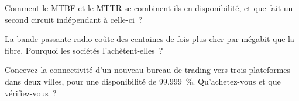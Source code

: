 \begin{interviewq}\label{iq:nw:buying-connectivity:4}
Comment le MTBF et le MTTR se combinent-ils en disponibilité, et que fait un second circuit indépendant à celle-ci~?
\end{interviewq}

\begin{interviewq}\label{iq:nw:buying-connectivity:5}
La bande passante radio coûte des centaines de fois plus cher par mégabit que la fibre. Pourquoi les sociétés l'achètent-elles~?
\end{interviewq}

\begin{interviewq}\label{iq:nw:buying-connectivity:6}
Concevez la connectivité d'un nouveau bureau de trading vers trois plateformes dans deux villes, pour une disponibilité de 99.999~\%. Qu'achetez-vous et que vérifiez-vous~?
\end{interviewq}
